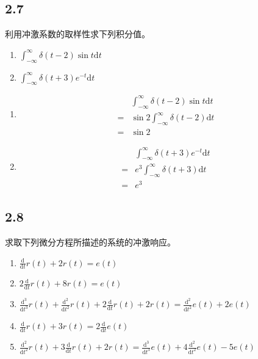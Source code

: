 \documentclass[UTF8]{ctexart}
\begin{document}
\subsection{2.7}

\begin{problem}
利用冲激系数的取样性求下列积分值。
\begin{enumerate}
    \item $\displaystyle \int_{-\infty}^{\infty}\delta(t-2)\sin t\mathrm{d}t$
    \item $\displaystyle \int_{-\infty}^{\infty}\delta(t+3)e^{-t}\mathrm{d}t$
\end{enumerate}
\end{problem}

\begin{solution}
\begin{enumerate}
    \item $$
    \begin{aligned}
    & \int_{-\infty}^{\infty}\delta(t-2)\sin t\mathrm{d}t \\
    = & \sin 2 \int_{-\infty}^{\infty}\delta(t-2)\mathrm{d}t \\
    = & \sin 2
    \end{aligned}
    $$
    
    \item $$
    \begin{aligned}
    & \int_{-\infty}^{\infty}\delta(t+3)e^{-t}\mathrm{d}t \\
    = & e^3 \int_{-\infty}^{\infty}\delta(t+3)\mathrm{d}t \\
    = & e^3
    \end{aligned}
    $$
\end{enumerate}
\end{solution}

\subsection{2.8}

\begin{problem}
求取下列微分方程所描述的系统的冲激响应。
\begin{enumerate}
    \item $\displaystyle \frac{\mathrm{d}}{\mathrm{d}t}r(t)+2r(t)=e(t)$
    \item $\displaystyle 2\frac{\mathrm{d}}{\mathrm{d}t}r(t)+8r(t)=e(t)$
    \item $\displaystyle \frac{\mathrm{d}^{3}}{\mathrm{d}t^{3}}r(t)+\frac{\mathrm{d}^{2}}{\mathrm{d}t^{2}}r(t)+2\frac{\mathrm{d}}{\mathrm{d}t}r(t)+2r(t)=\frac{\mathrm{d}^{2}}{\mathrm{d}t^{2}}e(t)+2e(t)$
    \item $\displaystyle \frac{\mathrm{d}}{\mathrm{d}t}r(t)+3r(t)=2\frac{\mathrm{d}}{\mathrm{d}t}e(t)$
    \item $\displaystyle \frac{\mathrm{d}^{2}}{\mathrm{d}t^{2}}r(t)+3\frac{\mathrm{d}}{\mathrm{d}t}r(t)+2r(t)=\frac{\mathrm{d}^{3}}{\mathrm{d}t^{3}}e(t)+4\frac{\mathrm{d}^{2}}{\mathrm{d}t^{2}}e(t)-5e(t)$
\end{enumerate}
\end{problem}
\end{document}
